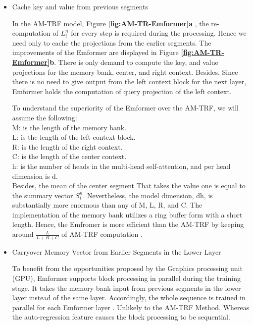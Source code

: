 \begin{itemize}
    \item Cache key and value from previous segments
 


In the AM-TRF model, Figure \textbf{\ref{fig:AM-TR-Emformer}a} , the re-computation of \( L_{i}^{n}\) for every step is required during the processing. Hence we need only to cache the projections from the earlier segments. The improvements of the Emformer are displayed in Figure \textbf{\ref{fig:AM-TR-Emformer}b}. There is only demand to compute the key, and value projections for the memory bank, center, and right context. Besides, Since there is no need to give output from the left context block for the next layer, Emformer holds the computation of query projection of the left context.

 To understand the superiority of the Emformer over the AM-TRF, we will assume the following:\\
M: is the length of the memory bank. \\
L: is the length of the left context block.\\ 
R: is the length of the right context.\\ 
C: is the length of the center context. \\
h: is the number of heads in the multi-head self-attention, and per head dimension is d. \\
Besides, the mean of the center segment That takes the value one is equal to the summary vector \( S_{i}^{n}\). Nevertheless, the model dimension, dh, is substantially more enormous than any of M, L, R, and C. The implementation of the memory bank utilizes a ring buffer form with a short length. Hence, the Emfromer is more efficient than the AM-TRF by keeping around \(  \frac{L}{L+R+C}\)  of AM-TRF computation \cite{shi2021emformer}.


 
 \item Carryover Memory Vector from Earlier Segments in the Lower Layer




To benefit from the opportunities proposed by the Graphics processing unit (GPU), Emformer supports block processing in parallel during the training stage. It takes the memory bank input from previous segments in the lower layer instead of the same layer. Accordingly, the whole sequence is trained in parallel for each Emformer layer \cite{shi2021emformer}. Unlikely to the AM-TRF Method. Whereas the auto-regression feature causes the block processing to be sequential.
 

\end{itemize}
